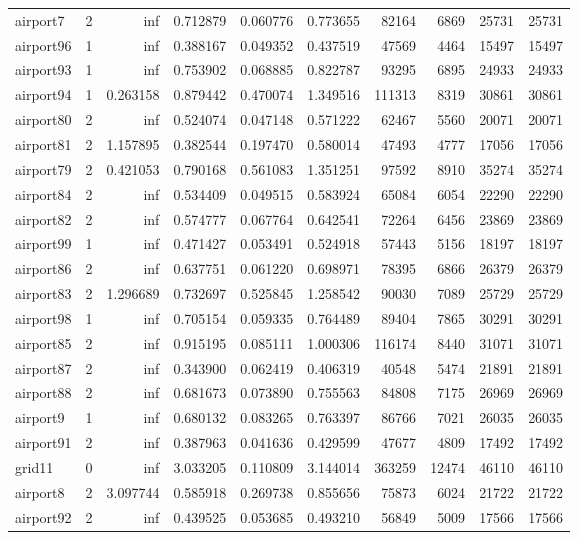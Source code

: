 \documentclass[../../../thesis.tex]{subfiles}
\begin{document}
\begin{longtable}{|l|r|r|r|r|r|r|r|r|r|}
airport7 & 2 & inf & 0.712879 & 0.060776 & 0.773655 & 82164 & 6869 & 25731 & 25731 \\
airport96 & 1 & inf & 0.388167 & 0.049352 & 0.437519 & 47569 & 4464 & 15497 & 15497 \\
airport93 & 1 & inf & 0.753902 & 0.068885 & 0.822787 & 93295 & 6895 & 24933 & 24933 \\
airport94 & 1 & 0.263158 & 0.879442 & 0.470074 & 1.349516 & 111313 & 8319 & 30861 & 30861 \\
airport80 & 2 & inf & 0.524074 & 0.047148 & 0.571222 & 62467 & 5560 & 20071 & 20071 \\
airport81 & 2 & 1.157895 & 0.382544 & 0.197470 & 0.580014 & 47493 & 4777 & 17056 & 17056 \\
airport79 & 2 & 0.421053 & 0.790168 & 0.561083 & 1.351251 & 97592 & 8910 & 35274 & 35274 \\
airport84 & 2 & inf & 0.534409 & 0.049515 & 0.583924 & 65084 & 6054 & 22290 & 22290 \\
airport82 & 2 & inf & 0.574777 & 0.067764 & 0.642541 & 72264 & 6456 & 23869 & 23869 \\
airport99 & 1 & inf & 0.471427 & 0.053491 & 0.524918 & 57443 & 5156 & 18197 & 18197 \\
airport86 & 2 & inf & 0.637751 & 0.061220 & 0.698971 & 78395 & 6866 & 26379 & 26379 \\
airport83 & 2 & 1.296689 & 0.732697 & 0.525845 & 1.258542 & 90030 & 7089 & 25729 & 25729 \\
airport98 & 1 & inf & 0.705154 & 0.059335 & 0.764489 & 89404 & 7865 & 30291 & 30291 \\
airport85 & 2 & inf & 0.915195 & 0.085111 & 1.000306 & 116174 & 8440 & 31071 & 31071 \\
airport87 & 2 & inf & 0.343900 & 0.062419 & 0.406319 & 40548 & 5474 & 21891 & 21891 \\
airport88 & 2 & inf & 0.681673 & 0.073890 & 0.755563 & 84808 & 7175 & 26969 & 26969 \\
airport9 & 1 & inf & 0.680132 & 0.083265 & 0.763397 & 86766 & 7021 & 26035 & 26035 \\
airport91 & 2 & inf & 0.387963 & 0.041636 & 0.429599 & 47677 & 4809 & 17492 & 17492 \\
grid11 & 0 & inf & 3.033205 & 0.110809 & 3.144014 & 363259 & 12474 & 46110 & 46110 \\
airport8 & 2 & 3.097744 & 0.585918 & 0.269738 & 0.855656 & 75873 & 6024 & 21722 & 21722 \\
airport92 & 2 & inf & 0.439525 & 0.053685 & 0.493210 & 56849 & 5009 & 17566 & 17566 \\

\end{longtable}
\end{document}
